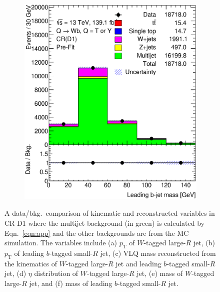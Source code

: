 \begin{figure}[hbt!]
\begin{subfigure}{.35\textwidth}
		\caption{}
		\label{fig:app:cr_d1:ljet_m}
	\end{subfigure}\hspace{0.6cm}
	\begin{subfigure}{.35\textwidth}
		\centering
		\includegraphics[width=\linewidth,height=\textheight,keepaspectratio]{CR_D1_jet_m.eps}
		\caption{}
		\label{fig:app:cr_d1:jet_m}
	\end{subfigure}
	\caption{A data/bkg.\ comparison of kinematic and reconstructed variables in CR D1 where the multijet background (in green) is calculated by Eqn.\ \ref{eqn:app} and the other backgrounds are from the MC simulation. The variables include (a) $p_{\text{T}}$ of $W$-tagged large-$R$ jet, (b) $p_{\text{T}}$ of leading $b$-tagged small-$R$ jet, (c) VLQ mass reconstructed from the kinematics of $W$-tagged large-$R$ jet and leading $b$-tagged small-$R$ jet, (d) $\eta$ distribution of $W$-tagged large-$R$ jet, (e) mass of $W$-tagged large-$R$ jet, and (f) mass of leading $b$-tagged small-$R$ jet.}
	\label{fig:app:cr_d1}
\end{figure}


